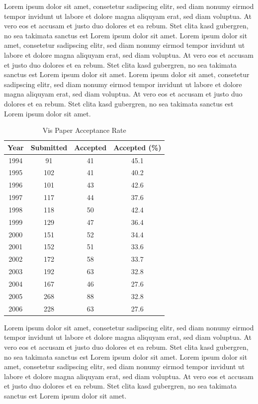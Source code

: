 \documentclass[journal]{vgtc}
\begin{document}
Lorem ipsum dolor sit amet, consetetur sadipscing elitr, sed diam
nonumy eirmod tempor invidunt ut labore et dolore magna aliquyam erat,
sed diam voluptua. At vero eos et accusam et justo duo dolores et ea
rebum. Stet clita kasd gubergren, no sea takimata sanctus est Lorem
ipsum dolor sit amet. Lorem ipsum dolor sit amet, consetetur
sadipscing elitr, sed diam nonumy eirmod tempor invidunt ut labore et
dolore magna aliquyam erat, sed diam voluptua. At vero eos et accusam
et justo duo dolores et ea rebum. Stet clita kasd gubergren, no sea
takimata sanctus est Lorem ipsum dolor sit amet. Lorem ipsum dolor sit
amet, consetetur sadipscing elitr, sed diam nonumy eirmod tempor
invidunt ut labore et dolore magna aliquyam erat, sed diam
voluptua. At vero eos et accusam et justo duo dolores et ea
rebum. Stet clita kasd gubergren, no sea takimata sanctus est Lorem
ipsum dolor sit amet.

\begin{table}
  \caption{\label{tab:vis_accept} Vis Paper Acceptance Rate}
  \scriptsize
  \begin{center}
    \begin{tabular}{cccc}
      Year & Submitted & Accepted & Accepted (\%)\\
      \hline
      1994 &  91 & 41 & 45.1\\
      1995 & 102 & 41 & 40.2\\
      1996 & 101 & 43 & 42.6\\
      1997 & 117 & 44 & 37.6\\
      1998 & 118 & 50 & 42.4\\
      1999 & 129 & 47 & 36.4\\
      2000 & 151 & 52 & 34.4\\
      2001 & 152 & 51 & 33.6\\
      2002 & 172 & 58 & 33.7\\
      2003 & 192 & 63 & 32.8\\
      2004 & 167 & 46 & 27.6\\
      2005 & 268 & 88 & 32.8\\
      2006 & 228 & 63 & 27.6
    \end{tabular}
  \end{center}
\end{table}


Lorem ipsum dolor sit amet, consetetur sadipscing elitr, sed diam
nonumy eirmod tempor invidunt ut labore et dolore magna aliquyam erat,
sed diam voluptua. At vero eos et accusam et justo duo dolores et ea
rebum. Stet clita kasd gubergren, no sea takimata sanctus est Lorem
ipsum dolor sit amet. Lorem ipsum dolor sit amet, consetetur
sadipscing elitr, sed diam nonumy eirmod tempor invidunt ut labore et
dolore magna aliquyam erat, sed diam voluptua. At vero eos et accusam
et justo duo dolores et ea rebum. Stet clita kasd gubergren, no sea
takimata sanctus est Lorem ipsum dolor sit amet.
\end{document}
